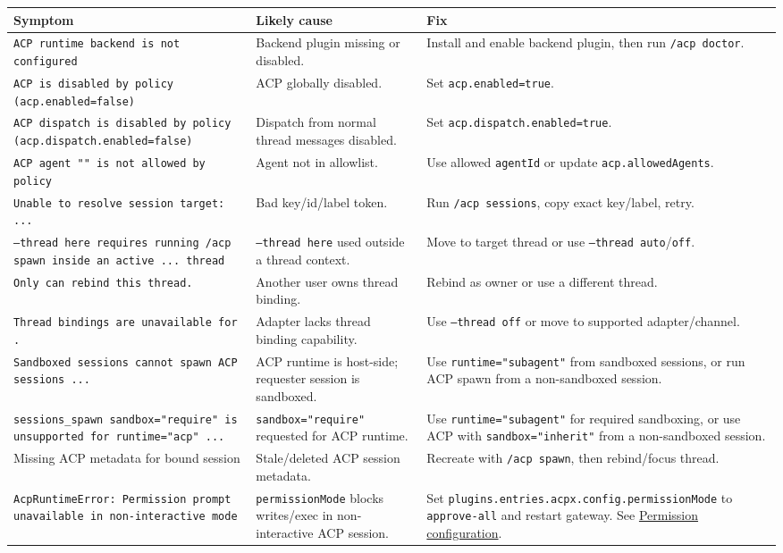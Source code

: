 \begin{table}[h]
\centering
\small
\begin{tabular}{|l|l|l|}
\hline
Symptom & Likely cause & Fix \\
\hline
\texttt{ACP runtime backend is not configured} & Backend plugin missing or disabled. & Install and enable backend plugin, then run \texttt{/acp doctor}. \\
\hline
\texttt{ACP is disabled by policy (acp.enabled=false)} & ACP globally disabled. & Set \texttt{acp.enabled=true}. \\
\hline
\texttt{ACP dispatch is disabled by policy (acp.dispatch.enabled=false)} & Dispatch from normal thread messages disabled. & Set \texttt{acp.dispatch.enabled=true}. \\
\hline
\texttt{ACP agent "" is not allowed by policy} & Agent not in allowlist. & Use allowed \texttt{agentId} or update \texttt{acp.allowedAgents}. \\
\hline
\texttt{Unable to resolve session target: ...} & Bad key/id/label token. & Run \texttt{/acp sessions}, copy exact key/label, retry. \\
\hline
\texttt{--thread here requires running /acp spawn inside an active ... thread} & \texttt{--thread here} used outside a thread context. & Move to target thread or use \texttt{--thread auto}/\texttt{off}. \\
\hline
\texttt{Only  can rebind this thread.} & Another user owns thread binding. & Rebind as owner or use a different thread. \\
\hline
\texttt{Thread bindings are unavailable for .} & Adapter lacks thread binding capability. & Use \texttt{--thread off} or move to supported adapter/channel. \\
\hline
\texttt{Sandboxed sessions cannot spawn ACP sessions ...} & ACP runtime is host-side; requester session is sandboxed. & Use \texttt{runtime="subagent"} from sandboxed sessions, or run ACP spawn from a non-sandboxed session. \\
\hline
\texttt{sessions\_spawn sandbox="require" is unsupported for runtime="acp" ...} & \texttt{sandbox="require"} requested for ACP runtime. & Use \texttt{runtime="subagent"} for required sandboxing, or use ACP with \texttt{sandbox="inherit"} from a non-sandboxed session. \\
\hline
Missing ACP metadata for bound session & Stale/deleted ACP session metadata. & Recreate with \texttt{/acp spawn}, then rebind/focus thread. \\
\hline
\texttt{AcpRuntimeError: Permission prompt unavailable in non-interactive mode} & \texttt{permissionMode} blocks writes/exec in non-interactive ACP session. & Set \texttt{plugins.entries.acpx.config.permissionMode} to \texttt{approve-all} and restart gateway. See \href{\#permission-configuration}{Permission configuration}. \\

\end{tabular}
\end{table}

